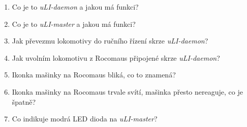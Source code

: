 \documentclass[12pt,a4paper]{article}
\begin{document}
\begin{enumerate}
	\item Co je to \textit{uLI-daemon} a jakou má funkci?
	
	\item Co je to \textit{uLI-master} a jakou má funkci?
	
	\item Jak převezmu lokomotivy do ručního řízení skrze \textit{uLI-daemon}?
	
	\item Jak uvolním lokomotivu z Rocomaus připojené skrze \textit{uLI-daemon}?
	
	\item Ikonka mašinky na Rocomaus bliká, co to znamená?
	
	\item Ikonka mašinky na Rocomaus trvale svítí, mašinka přesto nereaguje, co je špatně?
	
	\item Co indikuje modrá LED dioda na \textit{uLI-master}?
	
\end{enumerate}
\end{document}
